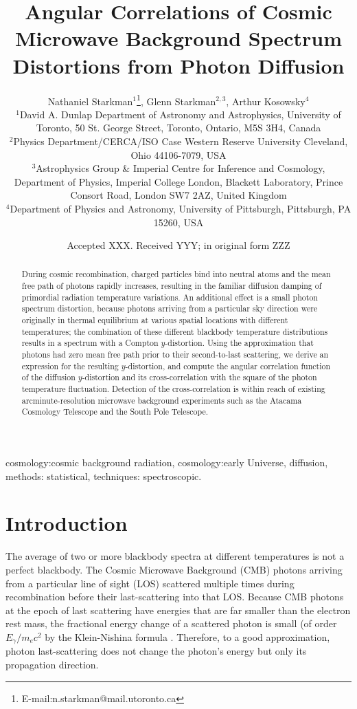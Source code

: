 \documentclass[fleqn,usenatbib]{mnras}
\title[Angular Correlations of CMB Spectrum Distortions from Photon Diffusion]{
Angular Correlations of Cosmic Microwave Background Spectrum Distortions from
Photon Diffusion}
\author[N. Starkman et al.]{ Nathaniel Starkman$^{1}$\thanks{E-mail:n.starkman@mail.utoronto.ca}, Glenn Starkman$^{2,3}$, Arthur Kosowsky$^{4}$ \\
$^{1}$David A. Dunlap Department of Astronomy and Astrophysics, University of Toronto, 50 St. George Street, Toronto, Ontario, M5S 3H4, Canada\\
$^{2}$Physics Department/CERCA/ISO Case Western Reserve University Cleveland, Ohio 44106-7079, USA\\
$^{3}$Astrophysics Group \& Imperial Centre for Inference and Cosmology, Department of Physics, Imperial College London, Blackett Laboratory, Prince Consort Road, London SW7 2AZ, United Kingdom\\
$^{4}$Department of Physics and Astronomy, University of Pittsburgh, Pittsburgh, PA 15260, USA\\
}
\date{Accepted XXX.  Received YYY; in original form ZZZ}
\begin{document}
\pagerange{\pageref{firstpage}--\pageref{lastpage}}
\maketitle

\begin{abstract}

    During cosmic recombination, charged particles bind into neutral atoms and
    the mean free path of photons rapidly increases, resulting in the familiar
    diffusion damping of primordial radiation temperature variations.  An
    additional effect is a small photon spectrum distortion, because photons
    arriving from a particular sky direction were originally in thermal
    equilibrium at various spatial locations with different temperatures; the
    combination of these different blackbody temperature distributions results
    in a spectrum with a Compton $y$-distortion.  Using the approximation that
    photons had zero mean free path prior to their second-to-last scattering, we
    derive an expression for the resulting $y$-distortion, and compute the
    angular correlation function of the diffusion $y$-distortion and its
    cross-correlation with the square of the photon temperature fluctuation.
    Detection of the cross-correlation is within reach of existing
    arcminute-resolution microwave background experiments such as the Atacama
    Cosmology Telescope and the South Pole Telescope.

\end{abstract}

\begin{keywords}
    cosmology:cosmic background radiation, cosmology:early Universe, diffusion,
    methods: statistical, techniques: spectroscopic.
\end{keywords}




\label{firstpage}

\section{Introduction} \label{sec:intro}

    The average of two or more blackbody spectra at different temperatures is
    not a perfect blackbody.  The Cosmic Microwave Background (CMB) photons
    arriving from a particular line of sight (LOS) scattered multiple times
    during recombination before their last-scattering into that LOS.  Because
    CMB photons at the epoch of last scattering have energies that are far
    smaller than the electron rest mass, the fractional energy change of a
    scattered photon is small (of order $E_\gamma / m_e c^2$ by the
    Klein-Nishina formula \citep[as translated in
    \cite{KleinNishina1994}]{KleinNishina1929}.  Therefore, to a good
    approximation, photon last-scattering does not change the photon's energy
    but only its propagation direction.
\end{document}
